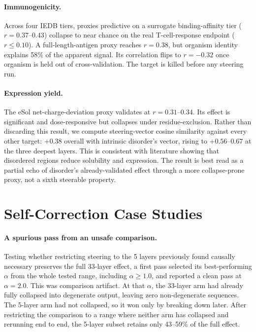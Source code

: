 \documentclass{article}
\begin{document}
\paragraph{Immunogenicity.} Across four IEDB tiers, proxies predictive on
a surrogate binding-affinity tier ($r=0.37$--$0.43$) collapse to near
chance on the real T-cell-response endpoint ($r\leq0.10$). A
full-length-antigen proxy reaches $r=0.38$, but organism identity explains
58\% of the apparent signal. Its correlation flips to $r=-0.32$ once
organism is held out of cross-validation. The target is killed before any
steering run.

\paragraph{Expression yield.} The eSol net-charge-deviation proxy
validates at $r=0.31$--$0.34$. Its effect is significant and
dose-responsive but collapses under residue-exclusion. Rather than
discarding this result, we compute steering-vector cosine similarity
against every other target: $+0.38$ overall with intrinsic disorder's
vector, rising to $+0.56$--$0.67$ at the three deepest layers. This is
consistent with literature showing that disordered regions reduce
solubility and expression. The result is best read as a partial echo of disorder's
already-validated effect through a more collapse-prone proxy, not a
sixth steerable property.

\section{Self-Correction Case Studies}
\label{sec:cases}

\paragraph{A spurious pass from an unsafe comparison.} Testing whether
restricting steering to the 5 layers previously found causally necessary
preserves the full 33-layer effect, a first pass selected its
best-performing $\alpha$ from the whole tested range, including
$\alpha\geq1.0$, and reported a clean pass at $\alpha=2.0$. This was
comparison artifact. At that $\alpha$, the 33-layer arm had already fully
collapsed into degenerate output, leaving zero non-degenerate sequences.
The 5-layer arm had not collapsed, so it won only by breaking down later.
After restricting the comparison to a range where neither arm has
collapsed and rerunning end to end, the 5-layer subset retains only
43--59\% of the full effect.
\end{document}

